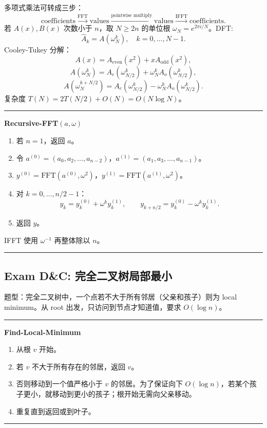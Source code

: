 \documentclass[UTF8,a4paper,11pt]{ctexart}
\newenvironment{algobox}[1]
{\par\medskip\noindent\begin{minipage}{0.96\linewidth}\hrule\vspace{0.35em}\textbf{#1}\par\vspace{0.25em}\small}
{\par\vspace{0.25em}\hrule\end{minipage}\par\medskip}
\begin{document}
多项式乘法可转成三步：
\[
\text{coefficients}\xrightarrow{\mathrm{FFT}}\text{values}
\xrightarrow{\text{pointwise multiply}}\text{values}
\xrightarrow{\mathrm{IFFT}}\text{coefficients}.
\]
若 $A(x),B(x)$ 次数小于 $n$，取 $N\ge 2n$ 的单位根 $\omega_N=e^{2\pi i/N}$。DFT:
\[
\hat A_k=A(\omega_N^k),\quad k=0,\ldots,N-1.
\]
Cooley-Tukey 分解：
\[
A(x)=A_{\mathrm{even}}(x^2)+xA_{\mathrm{odd}}(x^2),
\]
\[
A(\omega_N^k)=A_e(\omega_{N/2}^k)+\omega_N^k A_o(\omega_{N/2}^k),
\]
\[
A(\omega_N^{k+N/2})=A_e(\omega_{N/2}^k)-\omega_N^k A_o(\omega_{N/2}^k).
\]
复杂度 $T(N)=2T(N/2)+O(N)=O(N\log N)$。

\begin{algobox}{Recursive-FFT$(a,\omega)$}
\begin{enumerate}
  \item 若 $n=1$，返回 $a$。
  \item 令 $a^{(0)}=(a_0,a_2,\ldots,a_{n-2})$，$a^{(1)}=(a_1,a_3,\ldots,a_{n-1})$。
  \item $y^{(0)}=\mathrm{FFT}(a^{(0)},\omega^2)$，$y^{(1)}=\mathrm{FFT}(a^{(1)},\omega^2)$。
  \item 对 $k=0,\ldots,n/2-1$：
  \[
  y_k=y^{(0)}_k+\omega^k y^{(1)}_k,\qquad
  y_{k+n/2}=y^{(0)}_k-\omega^k y^{(1)}_k.
  \]
  \item 返回 $y$。
\end{enumerate}
IFFT 使用 $\omega^{-1}$ 再整体除以 $n$。
\end{algobox}

\begin{center}
\end{center}

\subsection{Exam D\&C: 完全二叉树局部最小}

题型：完全二叉树中，一个点若不大于所有邻居（父亲和孩子）则为 local minimum。从 root 出发，只访问到节点才知道值，要求 $O(\log n)$。

\begin{algobox}{Find-Local-Minimum}
\begin{enumerate}
  \item 从根 $v$ 开始。
  \item 若 $v$ 不大于所有存在的邻居，返回 $v$。
  \item 否则移动到一个值严格小于 $v$ 的邻居。为了保证向下 $O(\log n)$，若某个孩子更小，就移动到更小的孩子；根开始无需向父亲移动。
  \item 重复直到返回或到叶子。
\end{enumerate}
\end{algobox}
\end{document}
